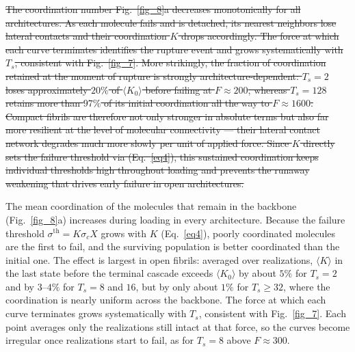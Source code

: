 \documentclass[aps,physrev,preprint,groupedaddress,linenumbers]{revtex4-2}
\newcommand{\added}[1]{{\color{red}#1}}
\newcommand{\deleted}[1]{{\color{red}\sout{#1}}}
\begin{document}
\deleted{The coordination number Fig.~\ref{fig_8}a decreases monotonically for all architectures. As each molecule fails and is detached, its nearest neighbors lose lateral contacts and their coordination $K$ drops accordingly. The force at which each curve terminates identifies the rupture event and grows systematically with $T_s$, consistent with Fig.~\ref{fig_7}. More strikingly, the fraction of coordination retained at the moment of rupture is strongly architecture-dependent: $T_s = 2$ loses approximately $20\%$ of $\langle K_0 \rangle$ before failing at $F \approx 200$, whereas $T_s = 128$ retains more than $97\%$ of its initial coordination all the way to $F \approx 1600$. Compact fibrils are therefore not only stronger in absolute terms but also far more resilient at the level of molecular connectivity — their lateral contact network degrades much more slowly per unit of applied force. Since $K$ directly sets the failure threshold via (Eq.~\ref{eq4}), this sustained coordination keeps individual thresholds high throughout loading and prevents the runaway weakening that drives early failure in open architectures.}

\added{The mean coordination of the molecules that remain in the backbone (Fig.~\ref{fig_8}a) increases during loading in every architecture. Because the failure threshold $\sigma^{\mathrm{th}} = K\sigma_c X$ grows with $K$ (Eq.~\ref{eq4}), poorly coordinated molecules are the first to fail, and the surviving population is better coordinated than the initial one. The effect is largest in open fibrils: averaged over realizations, $\langle K \rangle$ in the last state before the terminal cascade exceeds $\langle K_0 \rangle$ by about $5\%$ for $T_s = 2$ and by $3$--$4\%$ for $T_s = 8$ and $16$, but by only about $1\%$ for $T_s \geq 32$, where the coordination is nearly uniform across the backbone. The force at which each curve terminates grows systematically with $T_s$, consistent with Fig.~\ref{fig_7}. Each point averages only the realizations still intact at that force, so the curves become irregular once realizations start to fail, as for $T_s = 8$ above $F \approx 300$.}
\end{document}
